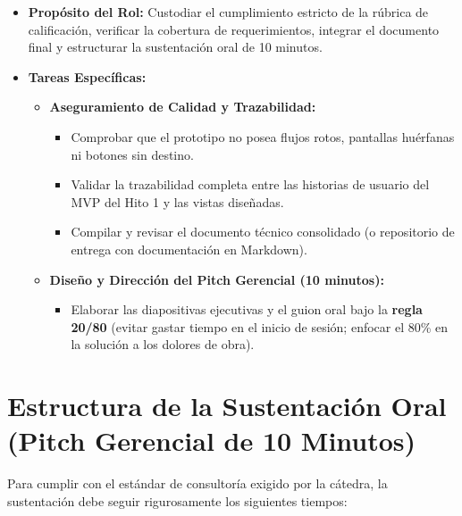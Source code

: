 \documentclass[11pt,letterpaper]{article}
\begin{document}
\begin{itemize}
    \item \textbf{Propósito del Rol:} Custodiar el cumplimiento estricto de la rúbrica de calificación, verificar la cobertura de requerimientos, integrar el documento final y estructurar la sustentación oral de 10 minutos.
    \item \textbf{Tareas Específicas:}
    \begin{itemize}
        \item \textbf{Aseguramiento de Calidad y Trazabilidad:}
        \begin{itemize}
            \item Comprobar que el prototipo no posea flujos rotos, pantallas huérfanas ni botones sin destino.
            \item Validar la trazabilidad completa entre las historias de usuario del MVP del Hito 1 y las vistas diseñadas.
            \item Compilar y revisar el documento técnico consolidado (o repositorio de entrega con documentación en Markdown).
        \end{itemize}
        \item \textbf{Diseño y Dirección del Pitch Gerencial (10 minutos):}
        \begin{itemize}
            \item Elaborar las diapositivas ejecutivas y el guion oral bajo la \textbf{regla 20/80} (evitar gastar tiempo en el inicio de sesión; enfocar el 80\% en la solución a los dolores de obra).
        \end{itemize}
    \end{itemize}
\end{itemize}

\section{Estructura de la Sustentación Oral (Pitch Gerencial de 10 Minutos)}

Para cumplir con el estándar de consultoría exigido por la cátedra, la sustentación debe seguir rigurosamente los siguientes tiempos:
\end{document}
